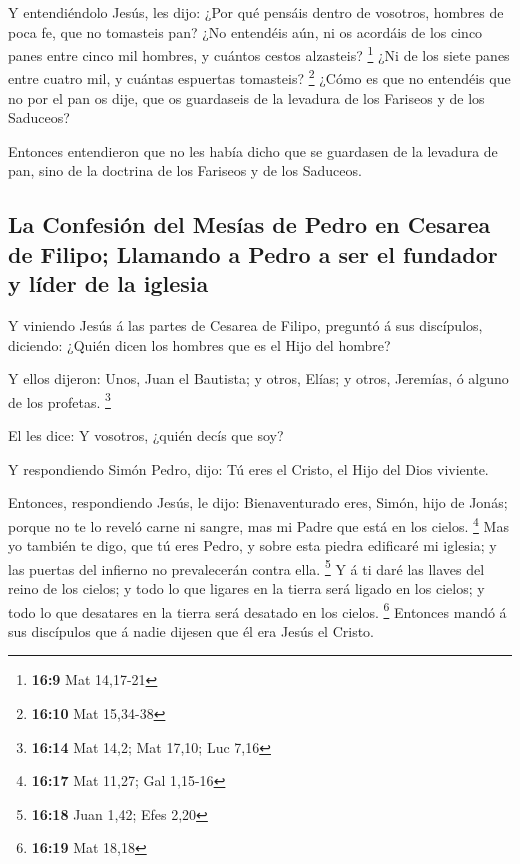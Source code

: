  Y entendiéndolo Jesús, les dijo: ¿Por qué pensáis dentro de
vosotros, hombres de poca fe, que no tomasteis pan?  ¿No
entendéis aún, ni os acordáis de los cinco panes entre cinco mil
hombres, y cuántos cestos alzasteis? \footnote{\textbf{16:9} Mat
  14,17-21}  ¿Ni de los siete panes entre cuatro mil, y
cuántas espuertas tomasteis? \footnote{\textbf{16:10} Mat 15,34-38}
 ¿Cómo es que no entendéis que no por el pan os dije, que
os guardaseis de la levadura de los Fariseos y de los Saduceos?

 Entonces entendieron que no les había dicho que se
guardasen de la levadura de pan, sino de la doctrina de los Fariseos y
de los Saduceos.

\hypertarget{la-confesiuxf3n-del-mesuxedas-de-pedro-en-cesarea-de-filipo-llamando-a-pedro-a-ser-el-fundador-y-luxedder-de-la-iglesia}{%
\subsection{La Confesión del Mesías de Pedro en Cesarea de Filipo;
Llamando a Pedro a ser el fundador y líder de la
iglesia}\label{la-confesiuxf3n-del-mesuxedas-de-pedro-en-cesarea-de-filipo-llamando-a-pedro-a-ser-el-fundador-y-luxedder-de-la-iglesia}}

 Y viniendo Jesús á las partes de Cesarea de Filipo,
preguntó á sus discípulos, diciendo: ¿Quién dicen los hombres que es el
Hijo del hombre?

 Y ellos dijeron: Unos, Juan el Bautista; y otros, Elías; y
otros, Jeremías, ó alguno de los profetas. \footnote{\textbf{16:14} Mat
  14,2; Mat 17,10; Luc 7,16}

 El les dice: Y vosotros, ¿quién decís que soy?

 Y respondiendo Simón Pedro, dijo: Tú eres el Cristo, el
Hijo del Dios viviente.

 Entonces, respondiendo Jesús, le dijo: Bienaventurado
eres, Simón, hijo de Jonás; porque no te lo reveló carne ni sangre, mas
mi Padre que está en los cielos. \footnote{\textbf{16:17} Mat 11,27; Gal
  1,15-16}  Mas yo también te digo, que tú eres Pedro, y
sobre esta piedra edificaré mi iglesia; y las puertas del infierno no
prevalecerán contra ella. \footnote{\textbf{16:18} Juan 1,42; Efes 2,20}
 Y á ti daré las llaves del reino de los cielos; y todo lo
que ligares en la tierra será ligado en los cielos; y todo lo que
desatares en la tierra será desatado en los cielos. \footnote{\textbf{16:19}
  Mat 18,18}  Entonces mandó á sus discípulos que á nadie
dijesen que él era Jesús el Cristo.


